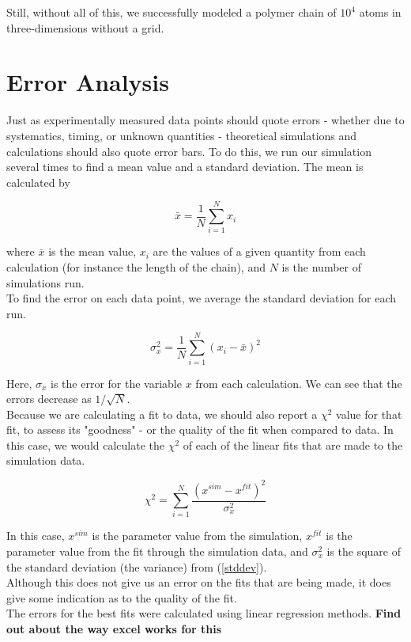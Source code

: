 \documentclass{article}
\begin{document}
\begin{multicols}{2}
Still, without all of this, we successfully modeled a polymer chain of $10^4$ atoms in three-dimensions without a grid.  \\

\appendix

\section{Error Analysis}

Just as experimentally measured data points should quote errors - whether due to systematics, timing, or unknown quantities - theoretical simulations and calculations should also quote error bars.  To do this, we run our simulation several times to find a mean value and a standard deviation.  The mean is calculated by

\begin{equation}
\bar x = \frac{1}{N} \sum \limits _{i=1}^N x_i
\end{equation}

\noindent where $\bar x$ is the mean value, $x_i$ are the values of a given quantity from each calculation (for instance the length of the chain), and $N$ is the number of simulations run.\\

To find the error on each data point, we average the standard deviation for each run.

\begin{equation}
\label{stddev}
\sigma _x^2 = \frac{1}{N} \sum \limits _{i=1} ^N (x_i - \bar x)^2
\end{equation}

\noindent Here, $\sigma _x$ is the error for the variable $x$ from each calculation.  We can see that the errors decrease as $1/\sqrt{N}$.  \\

Because we are calculating a fit to data, we should also report a $\chi ^2$ value for that fit, to assess its "goodness" - or the quality of the fit when compared to data.  \cite{Nunes}  In this case, we would calculate the $\chi^2$ of each of the linear fits that are made to the simulation data.

\begin{equation}
\chi ^2 = \sum \limits _{i=1} ^N \frac{(x^{sim} - x^{fit})^2}{\sigma _x ^2}
\end{equation}

\noindent In this case, $x^{sim}$ is the parameter value from the simulation, $x^{fit}$ is the parameter value from the fit through the simulation data, and $\sigma _x ^2$ is the square of the standard deviation (the variance) from (\ref{stddev}). \\

Although this does not give us an error on the fits that are being made, it does give some indication as to the quality of the fit.\\

The errors for the best fits were calculated using linear regression methods.  \textbf{Find out about the way excel works for this}

\end{multicols}


\end{document}
